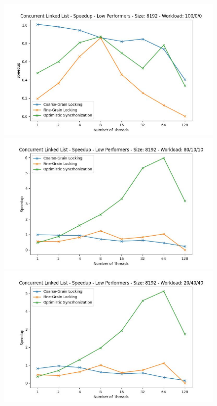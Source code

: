 \documentclass[../final_report.tex]{subfiles}
\begin{document}
\begin{figure}[H]
    \centering
        \includegraphics[scale=0.4]{outFiles/plots/concurrent_data_structs_low_speedup_8192_100_0_0.jpg}
        \includegraphics[scale=0.4]{outFiles/plots/concurrent_data_structs_low_speedup_8192_80_10_10.jpg}
        \includegraphics[scale=0.4]{outFiles/plots/concurrent_data_structs_low_speedup_8192_20_40_40.jpg}

\end{figure}
\end{document}
